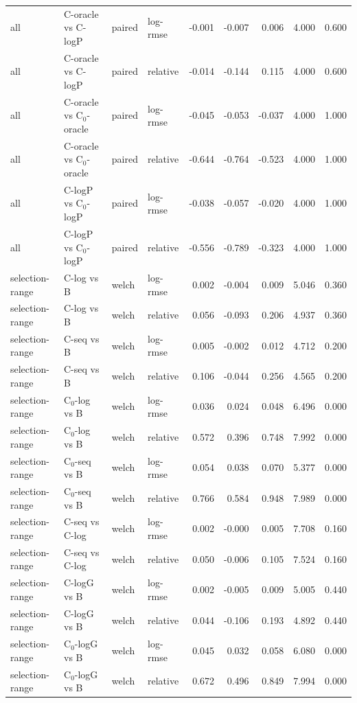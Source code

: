 \begin{longtable}{llllrrrrr}
all & C-oracle vs C-logP & paired & log-rmse & -0.001 & -0.007 & 0.006 & 4.000 & 0.600 \\
all & C-oracle vs C-logP & paired & relative & -0.014 & -0.144 & 0.115 & 4.000 & 0.600 \\
all & C-oracle vs C$_0$-oracle & paired & log-rmse & -0.045 & -0.053 & -0.037 & 4.000 & 1.000 \\
all & C-oracle vs C$_0$-oracle & paired & relative & -0.644 & -0.764 & -0.523 & 4.000 & 1.000 \\
all & C-logP vs C$_0$-logP & paired & log-rmse & -0.038 & -0.057 & -0.020 & 4.000 & 1.000 \\
all & C-logP vs C$_0$-logP & paired & relative & -0.556 & -0.789 & -0.323 & 4.000 & 1.000 \\
selection-range & C-log vs B & welch & log-rmse & 0.002 & -0.004 & 0.009 & 5.046 & 0.360 \\
selection-range & C-log vs B & welch & relative & 0.056 & -0.093 & 0.206 & 4.937 & 0.360 \\
selection-range & C-seq vs B & welch & log-rmse & 0.005 & -0.002 & 0.012 & 4.712 & 0.200 \\
selection-range & C-seq vs B & welch & relative & 0.106 & -0.044 & 0.256 & 4.565 & 0.200 \\
selection-range & C$_0$-log vs B & welch & log-rmse & 0.036 & 0.024 & 0.048 & 6.496 & 0.000 \\
selection-range & C$_0$-log vs B & welch & relative & 0.572 & 0.396 & 0.748 & 7.992 & 0.000 \\
selection-range & C$_0$-seq vs B & welch & log-rmse & 0.054 & 0.038 & 0.070 & 5.377 & 0.000 \\
selection-range & C$_0$-seq vs B & welch & relative & 0.766 & 0.584 & 0.948 & 7.989 & 0.000 \\
selection-range & C-seq vs C-log & welch & log-rmse & 0.002 & -0.000 & 0.005 & 7.708 & 0.160 \\
selection-range & C-seq vs C-log & welch & relative & 0.050 & -0.006 & 0.105 & 7.524 & 0.160 \\
selection-range & C-logG vs B & welch & log-rmse & 0.002 & -0.005 & 0.009 & 5.005 & 0.440 \\
selection-range & C-logG vs B & welch & relative & 0.044 & -0.106 & 0.193 & 4.892 & 0.440 \\
selection-range & C$_0$-logG vs B & welch & log-rmse & 0.045 & 0.032 & 0.058 & 6.080 & 0.000 \\
selection-range & C$_0$-logG vs B & welch & relative & 0.672 & 0.496 & 0.849 & 7.994 & 0.000 \\

\end{longtable}
